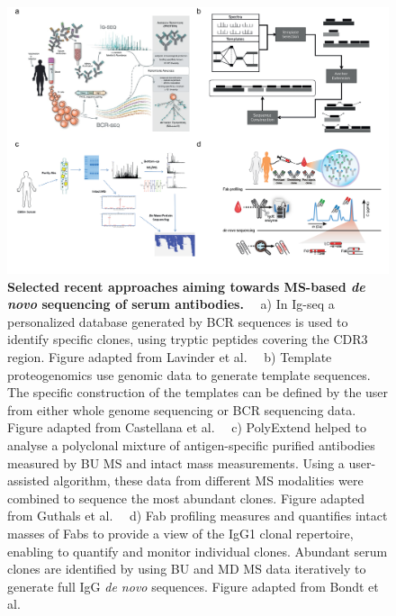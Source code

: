 \begin{figure}[!htb]
  \center
  \includegraphics[]{Chapter.1/Figures/f6.png}
  \caption{
    \textbf{Selected recent approaches aiming towards MS-based \emph{de novo} sequencing of serum antibodies.} ~~a) In Ig-seq \cite{lavinder2015next-generation} a personalized database generated by BCR sequences is used to identify specific clones, using tryptic peptides covering the CDR3 region. Figure adapted from Lavinder et al. \cite{lavinder2015next-generation} ~~b) Template proteogenomics \cite{castellana2010template} use genomic data to generate template sequences. The specific construction of the templates can be defined by the user from either whole genome sequencing or BCR sequencing data. Figure adapted from Castellana et al. \cite{castellana2010template} ~~c) PolyExtend \cite{guthals2017de} helped to analyse a polyclonal mixture of antigen-specific purified antibodies measured by BU MS and intact mass measurements. Using a user-assisted algorithm, these data from different MS modalities were combined to sequence the most abundant clones. Figure adapted from Guthals et al. \cite{guthals2017de} ~~d) Fab profiling \cite{bondt2021human} measures and quantifies intact masses of Fabs to provide a view of the IgG1 clonal repertoire, enabling to quantify and monitor individual clones. Abundant serum clones are identified by using BU and MD MS data iteratively to generate full IgG \emph{de novo} sequences. Figure adapted from Bondt et al. \cite{bondt2021human}
  }
  \label{fig:fig1.6}
\end{figure}


